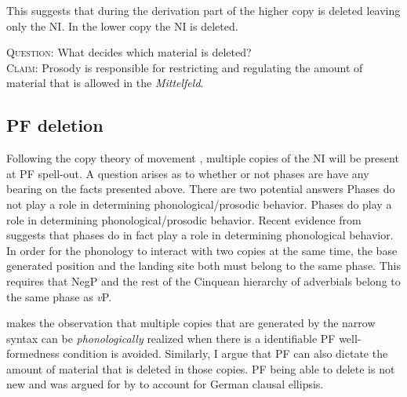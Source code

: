 \documentclass[12pt, letterpaper]{article}
\begin{document}
\ex This suggests that during the derivation part of the higher copy is deleted leaving only the NI. In the lower copy the NI is deleted.
\\
\label{ex:tree}
\z 
\begin{tcolorbox}[width=\linewidth]
\textsc{Question:} What decides which material is deleted?\\
\textsc{Claim:} Prosody is responsible for restricting and regulating the amount of material that is allowed in the \textit{Mittelfeld}.
\end{tcolorbox}

\subsection{PF deletion} \label{sec:PFDeletion}
\ea  Following the copy theory of movement \citet{chomskyMinimalistProgramLinguistic1993}, multiple copies of the NI will be present at PF spell-out. 
\ex A question arises as to whether or not phases are have any bearing on the facts presented above. 
\ex There are two potential answers
	\ea Phases do not play a role in determining phonological/prosodic behavior.  
	\ex Phases do play a role in determining phonological/prosodic behavior.
	\z 
\ex Recent evidence from \citet{weberPhasebasedConstraintsMatch2020} suggests that phases do in fact play a role in determining phonological behavior. 
\ex In order for the phonology to interact with two copies at the same time, the base generated position and the landing site both must belong to the same phase. 
	\ea This requires that NegP and the rest of the Cinquean hierarchy of adverbials \citep{cinqueAdverbsFunctionalHeads1999} belong to the same phase as \emph{v}P.
	\z

\ex \citet{kandybowiczGrammarRepetitionNupe2008} makes the observation that multiple copies that are generated by the narrow syntax can be \emph{phonologically} realized when there is a identifiable PF well-formedness condition is avoided. 
	\ea Similarly, I argue that PF can also dictate the amount of material that is deleted in those copies. 
	\ex PF being able to delete is not new and was argued for by \citet{ottDeletionClausalEllipsis2016} to account for German clausal ellipsis. 
	\z 
\end{document}
